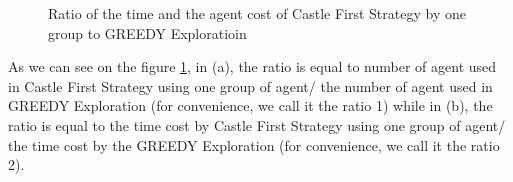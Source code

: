\begin{figure} [H]
  \centering 
    \hspace{1in} 
    \hspace{1in} 
    \caption{Ratio of the time and the agent cost of Castle First Strategy by one group to GREEDY Exploratioin} 
  \label{fig:C_AT} %
\end{figure}      
As we can see on the figure \ref{fig:C_AT}, in (a), the ratio is equal to number of agent used in Castle First Strategy using one group of agent/ the number of agent used in GREEDY Exploration (for convenience, we call it the ratio 1)  while in (b), the ratio is equal to the time cost by Castle First Strategy using one group of agent/ the time cost by the GREEDY Exploration (for convenience, we call it the ratio 2).

